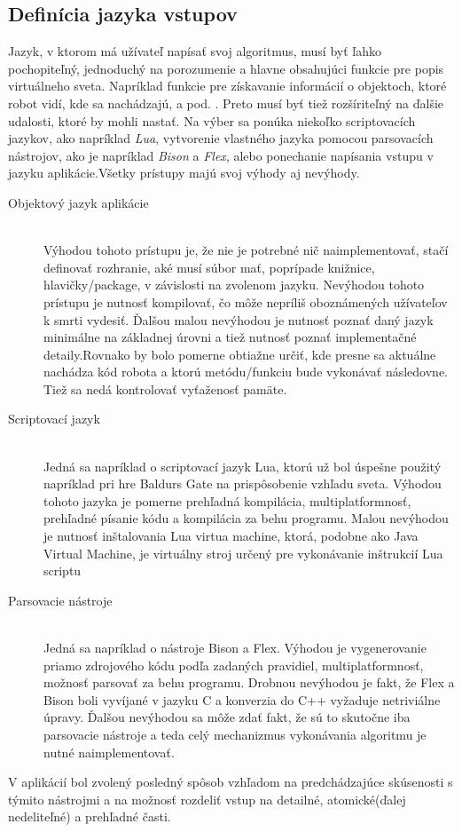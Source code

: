 \subsection{ Definícia jazyka vstupov }
Jazyk, v ktorom má užívateľ napísať svoj algoritmus, musí byť ľahko pochopiteľný, jednoduchý na porozumenie a hlavne obsahujúci funkcie pre popis virtuálneho sveta. Napríklad funkcie pre získavanie informácií o objektoch, ktoré robot vidí, kde sa nachádzajú, a pod. . Preto musí byť tiež rozšíriteľný na ďalšie udalosti, ktoré by mohli nastať. Na výber sa ponúka niekoľko scriptovacích jazykov, ako napríklad \emph{Lua}, vytvorenie vlastného jazyka pomocou parsovacích nástrojov, ako je napríklad \emph{Bison} a \emph{Flex}, alebo ponechanie napísania vstupu v jazyku aplikácie.Všetky prístupy majú svoj výhody aj nevýhody.
\begin{description}
	\item[Objektový jazyk aplikácie]\hfill \\ Výhodou tohoto prístupu je, že nie je potrebné nič naimplementovať, stačí definovať rozhranie, aké musí súbor mať, poprípade knižnice, hlavičky/package, v závislosti na zvolenom jazyku. Nevýhodou tohoto prístupu je nutnosť kompilovať, čo môže nepríliš oboznámených užívateľov k smrti vydesiť. Ďalšou malou nevýhodou je nutnosť poznať daný jazyk minimálne na základnej úrovni a tiež nutnosť poznať implementačné detaily.Rovnako by bolo pomerne obtiažne určiť, kde presne sa aktuálne nachádza kód robota a ktorú metódu/funkciu bude vykonávať následovne. Tiež sa nedá kontrolovať vyťaženosť pamäte.
	\item[Scriptovací jazyk]\hfill \\ Jedná sa napríklad o scriptovací jazyk Lua, ktorú už bol úspešne použitý napríklad pri hre Baldurs Gate na prispôsobenie vzhľadu sveta. Výhodou tohoto jazyka je pomerne prehľadná kompilácia, multiplatformnosť, prehľadné písanie kódu a kompilácia za behu programu. Malou nevýhodou je nutnosť inštalovania Lua virtua machine, ktorá, podobne ako Java Virtual Machine, je virtuálny stroj určený pre vykonávanie inštrukcií Lua scriptu
	\item[Parsovacie nástroje]\hfill \\ Jedná sa napríklad o nástroje Bison a Flex. Výhodou je vygenerovanie priamo zdrojového kódu podľa zadaných pravidiel, multiplatformnosť, možnosť parsovať za behu programu. Drobnou nevýhodou je fakt, že Flex a Bison boli vyvíjané v jazyku C a konverzia do C++ vyžaduje netriviálne úpravy. Ďalšou nevýhodou sa môže zdať fakt, že sú to skutočne iba parsovacie nástroje a teda celý mechanizmus vykonávania algoritmu je nutné naimplementovať.
\end{description}
V aplikácií bol zvolený posledný spôsob vzhľadom na predchádzajúce skúsenosti s týmito nástrojmi a na možnosť rozdeliť vstup na detailné, atomické(ďalej nedeliteľné) a prehľadné časti.

